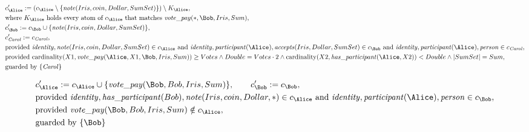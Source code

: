 \begin{align*}
&
c'_
{
\Alice
}
 := 
(c_
{
\Alice
}
 \setminus 
\{
\mathit{\detokenize{
note
}}
(
Iris
,
coin
,
Dollar
,
SumSet
)
\}
) \setminus K_
{
\Alice
}
,\\
&
\text{where } K_
{
\Alice
}
 \text{ holds every atom of } c_
{
\Alice
}
 \text{ that matches } 
\mathit{\detokenize{
vote_pay
}}
(
\ast
,
\Bob
,
Iris
,
Sum
)
,\\
&
c'_
{
\Bob
}
 := 
c_
{
\Bob
}
 \cup 
\{
\mathit{\detokenize{
note
}}
(
Iris
,
coin
,
Dollar
,
SumSet
)
\}
,\\
&
c'_
{
\mathit{Carol}
}
 := 
c_
{
\mathit{Carol}
}
,\\
&
\text{provided } 
\mathit{\detokenize{
identity
}}
,
\mathit{\detokenize{
note
}}
(
Iris
,
coin
,
Dollar
,
SumSet
)
 \in c_
{
\Alice
}
 \text{ and } 
\mathit{\detokenize{
identity
}}
,
\mathit{\detokenize{
participant
}}
(
\Alice
)
,
\mathit{\detokenize{
accepts
}}
(
Iris
,
Dollar
,
SumSet
)
 \in c_
{
\Bob
}
 \text{ and } 
\mathit{\detokenize{
identity
}}
,
\mathit{\detokenize{
participant
}}
(
\Alice
)
,
\mathit{\detokenize{
person
}}
 \in c_
{
\mathit{Carol}
}
,\\
&
\text{provided } 
\mathrm{cardinality}(
X1
,
\mathit{\detokenize{
vote_pay
}}
(
\Alice
,
X1
,
\Bob
,
Iris
,
Sum
)
)
\ge
Votes
\land
Double
=
Votes
\cdot
2
\land
\mathrm{cardinality}(
X2
,
\mathit{\detokenize{
has_participant
}}
(
\Alice
,
X2
)
)
<
Double
\land
|
SumSet
|
=
Sum
,\\
&
\text{guarded by } \{
\mathit{Carol}
\}
\end{align*}

\begin{align*}
&
c'_
{
\Alice
}
 := 
c_
{
\Alice
}
 \cup 
\{
\mathit{\detokenize{
vote_pay
}}
(
\Bob
,
Bob
,
Iris
,
Sum
)
\}
, \qquad 
c'_
{
\Bob
}
 := 
c_
{
\Bob
}
,\\
&
\text{provided } 
\mathit{\detokenize{
identity
}}
,
\mathit{\detokenize{
has_participant
}}
(
Bob
)
,
\mathit{\detokenize{
note
}}
(
Iris
,
coin
,
Dollar
,
\ast
)
 \in c_
{
\Alice
}
 \text{ and } 
\mathit{\detokenize{
identity
}}
,
\mathit{\detokenize{
participant
}}
(
\Alice
)
,
\mathit{\detokenize{
person
}}
 \in c_
{
\Bob
}
,\\
&
\text{provided } 
\mathit{\detokenize{
vote_pay
}}
(
\Bob
,
Bob
,
Iris
,
Sum
)
 \notin c_
{
\Alice
}
,\\
&
\text{guarded by } \{
\Bob
\}
\end{align*}

